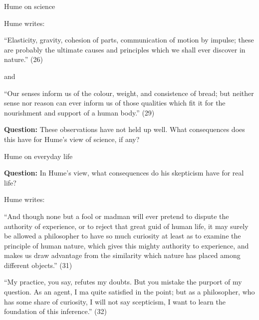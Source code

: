 \documentclass[8pt]{beamer}\usepackage[]{graphicx}\usepackage[]{color}
\begin{document}
\begin{frame}{Hume on science}

Hume writes:

\begin{addmargin}[2em]{2em}%
    ``Elasticity, gravity, cohesion of parts, communication of motion
    by impulse; these are probably the ultimate causes and principles
    which we shall ever discover in nature.'' (26)
\end{addmargin}

and

\begin{addmargin}[2em]{2em}%
    ``Our senses inform us of the colour, weight, and consistence of bread;
    but neither sense nor reason can ever inform us of those qualities
    which fit it for the nourishment and support of a human body.'' (29)
\end{addmargin}

\pause

\textbf{Question:}  These observations have not held up well.  What consequences
does this have for Hume's view of science, if any?

\end{frame}






\begin{frame}{Hume on everyday life}

\textbf{Question:}  In Hume's view, what consequences do his skepticism
have for real life?

\pause
Hume writes:

\begin{addmargin}[2em]{2em}%
    ``And though none but a fool or madman will ever pretend to dispute
    the authority of experience, or to reject that great guid of
    human life, it may surely be allowed a philosopher to have so
    much curiosity at least as to examine the principle of human
    nature, which gives this mighty authority to experience,
    and makes us draw advantage from the similarity which nature
    has placed among different objects.'' (31)
\end{addmargin}

\begin{addmargin}[2em]{2em}%
    ``My practice, you say, refutes my doubts.  But you mistake the
    purport of my question.  As an agent, I ma quite satisfied in the
    point; but as a philosopher, who has some share of curiosity,
    I will not say scepticism, I want to learn the foundation of this
    inference.'' (32)
\end{addmargin}



\end{frame}
\end{document}

